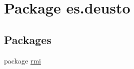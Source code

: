 \hypertarget{namespacees_1_1deusto}{}\section{Package es.\+deusto}
\label{namespacees_1_1deusto}
\subsection*{Packages}
\begin{DoxyCompactItemize}
\item 
package \mbox{\hyperlink{namespacees_1_1deusto_1_1rmi}{rmi}}
\end{DoxyCompactItemize}
